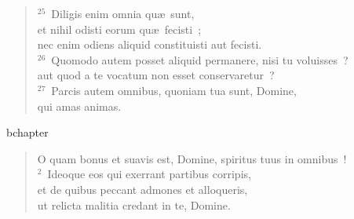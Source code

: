 \begin{verse}
${}^{25}$~Diligis enim omnia qu\ae\ sunt,\\ et nihil odisti eorum qu\ae\ fecisti~;\\ nec enim odiens aliquid constituisti aut fecisti.\\
${}^{26}$~Quomodo autem posset aliquid permanere, nisi tu voluisses~?\\ aut quod a te vocatum non esset conservaretur~?\\
${}^{27}$~Parcis autem omnibus, quoniam tua sunt, Domine,\\ qui amas animas.\end{verse}


bchapter\begin{verse}\vspace{-19pt}O quam bonus et suavis est, Domine, spiritus tuus in omnibus~!\\
${}^{2}$~Ideoque eos qui exerrant partibus corripis,\\ et de quibus peccant admones et alloqueris,\\ ut relicta malitia credant in te, Domine.\end{verse}


